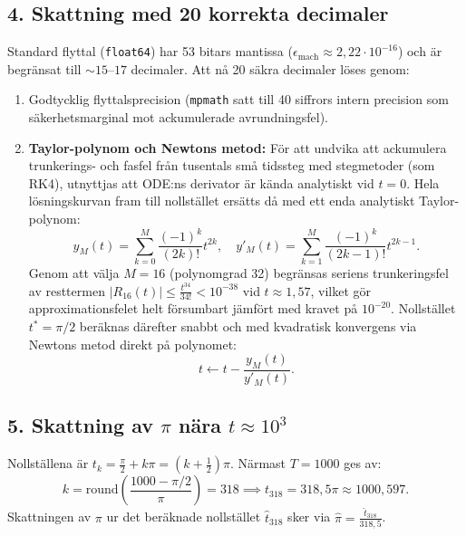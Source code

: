 \documentclass{article}
\begin{document}
\subsection*{4. Skattning med 20 korrekta decimaler}
Standard flyttal (\texttt{float64}) har 53 bitars mantissa ($\epsilon_{\text{mach}} \approx 2{,}22 \cdot 10^{-16}$) och är begränsat till $\sim 15$--$17$ decimaler. Att nå 20 säkra decimaler löses genom:
\begin{enumerate}
    \item Godtycklig flyttalsprecision (\texttt{mpmath} satt till 40 siffrors intern precision som säkerhetsmarginal mot ackumulerade avrundningsfel).
    \item \textbf{Taylor-polynom och Newtons metod:}
    För att undvika att ackumulera trunkerings- och fasfel från tusentals små tidssteg med stegmetoder (som RK4), utnyttjas att ODE:ns derivator är kända analytiskt vid $t = 0$. Hela lösningskurvan fram till nollstället ersätts då med ett enda analytiskt Taylor-polynom:
    \begin{equation}
        y_M(t) = \sum_{k=0}^{M} \frac{(-1)^k}{(2k)!} t^{2k}, \quad y'_M(t) = \sum_{k=1}^{M} \frac{(-1)^k}{(2k-1)!} t^{2k-1}.
    \end{equation}
    Genom att välja $M = 16$ (polynomgrad 32) begränsas seriens trunkeringsfel av resttermen $|R_{16}(t)| \le \frac{t^{34}}{34!} < 10^{-38}$ vid $t \approx 1{,}57$, vilket gör approximationsfelet helt försumbart jämfört med kravet på $10^{-20}$. Nollstället $t^* = \pi/2$ beräknas därefter snabbt och med kvadratisk konvergens via Newtons metod direkt på polynomet:
    \begin{equation}
        t \leftarrow t - \frac{y_M(t)}{y'_M(t)}.
    \end{equation}
\end{enumerate}

\subsection*{5. Skattning av $\pi$ nära $t \approx 10^3$}
Nollställena är $t_k = \frac{\pi}{2} + k\pi = \left(k + \frac{1}{2}\right)\pi$. Närmast $T = 1000$ ges av:
\begin{equation}
    k = \text{round}\left(\frac{1000 - \pi/2}{\pi}\right) = 318 \implies t_{318} = 318{,}5\pi \approx 1000{,}597.
\end{equation}
Skattningen av $\pi$ ur det beräknade nollstället $\hat{t}_{318}$ sker via $\hat{\pi} = \frac{\hat{t}_{318}}{318{,}5}$.
\end{document}
